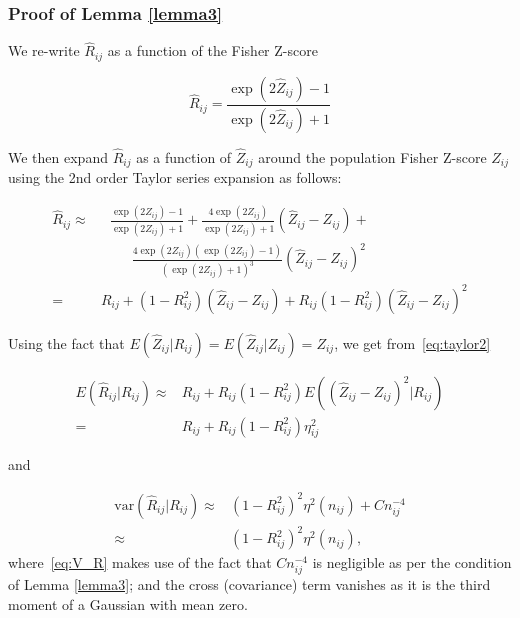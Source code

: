 \subsubsection*{Proof of Lemma \ref{lemma3}}

We re-write $\hat{R}_{ij}$ as a function of the Fisher Z-score

\begin{equation}\label{eq:hatR_to_hatZ}
    \hat{R}_{ij} = \frac{\exp(2 \hat{Z}_{ij}) - 1 }{\exp(2 \hat{Z}_{ij}) + 1} 
\end{equation}

We then expand $\hat{R}_{ij}$ as a function of $\hat{Z}_{ij}$ around the population Fisher Z-score $Z_{ij}$ using the 2nd order Taylor series expansion as follows: 

\begin{align}\label{eq:taylor2}
 \hat{R}_{ij} \approx&  ~~~\frac{\exp(2 Z_{ij}) - 1 }{\exp(2 Z_{ij}) + 1} + \frac{4 \exp(2 Z_{ij})}{\exp(2 Z_{ij}) + 1} (\hat{Z}_{ij} - Z_{ij}) + \nonumber \\ 
 &~~~~~~~~~~\frac{4\exp(2Z_{ij}){\left (\exp(2Z_{ij}) - 1 \right )}}{\left (\exp(2Z_{ij}) + 1 \right )^3} (\hat{Z}_{ij} - Z_{ij})^2 \nonumber\\ 
=& R_{ij} + (1-R^2_{ij})  (\hat{Z}_{ij} - Z_{ij}) + R_{ij} (1-R^2_{ij}) (\hat{Z}_{ij} - Z_{ij})^2 
\end{align}

Using the fact that $E(\hat{Z}_{ij} | R_{ij} ) = E(\hat{Z}_{ij} | Z_{ij})  = Z_{ij}$, we get from~\eqref {eq:taylor2}

\begin{equation}\label{eq:E_R}
\begin{aligned}
    E(\hat{R}_{ij} | R_{ij}) \approx& R_{ij} + R_{ij} (1 - R^2_{ij}) 
    E \left ((\hat{Z}_{ij} - Z_{ij})^2 | R_{ij} \right) \\
    =& R_{ij} + R_{ij} (1 - R^2_{ij}) \eta^2_{ij} 
\end{aligned}
\end{equation}

and 

\begin{equation}\label{eq:V_R}
\begin{aligned}
    \text{var} \left(\hat{R}_{ij}| R_{ij}\right) \approx& (1 - R^2_{ij})^2 \eta^2 (n_{ij}) + Cn^{-4}_{ij} \\
    \approx& (1- R^2_{ij})^2 \eta^2 (n_{ij}),
    \end{aligned}
\end{equation}
where~\eqref{eq:V_R} makes use of the fact that $Cn^{-4}_{ij}$ is negligible as per the condition of Lemma \ref{lemma3}; and the cross (covariance) term vanishes as it is the third moment of a Gaussian with mean zero. 

